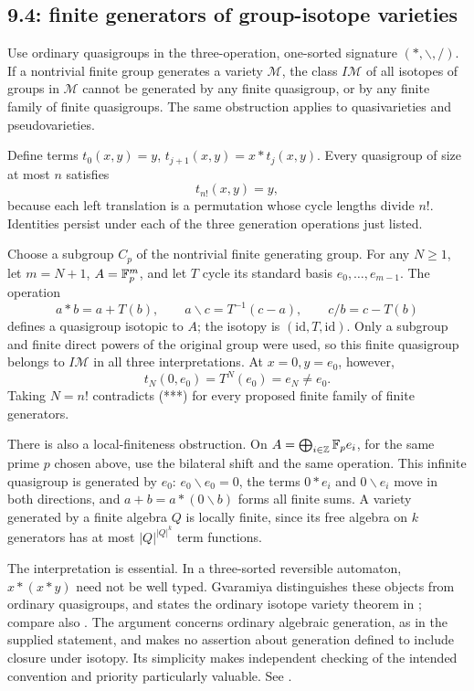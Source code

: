 \subsection{9.4: finite generators of group-isotope varieties}
\label{cand:9.4}
Use ordinary quasigroups in the three-operation, one-sorted signature
\((*,\backslash,/)\). If a nontrivial finite group generates a variety
\(\mathcal M\), the class \(I\mathcal M\) of all isotopes of groups in
\(\mathcal M\) cannot be generated by any finite quasigroup, or by any
finite family of finite quasigroups. The same obstruction applies to
quasivarieties and pseudovarieties.

Define terms \(t_0(x,y)=y\), \(t_{j+1}(x,y)=x*t_j(x,y)\).
Every quasigroup of size at most \(n\) satisfies
\[
 t_{n!}(x,y)=y,                                      \tag{***}
\]
because each left translation is a permutation whose cycle lengths
divide \(n!\). Identities persist under each of the three generation
operations just listed.

Choose a subgroup \(C_p\) of the nontrivial finite generating group.
For any \(N\ge1\), let \(m=N+1\), \(A=\mathbb F_p^m\), and let \(T\) cycle
its standard basis \(e_0,\ldots,e_{m-1}\).
The operation
\[
 a*b=a+T(b),\qquad
 a\backslash c=T^{-1}(c-a),\qquad c/b=c-T(b)
\]
defines a quasigroup isotopic to \(A\); the isotopy is
\((\mathrm{id},T,\mathrm{id})\). Only a subgroup and finite direct
powers of the original group were used, so this finite quasigroup
belongs to \(I\mathcal M\) in all three interpretations.
At \(x=0,y=e_0\), however,
\[
 t_N(0,e_0)=T^N(e_0)=e_N\ne e_0.
\]
Taking \(N=n!\) contradicts (***) for every proposed finite family of
finite generators.

There is also a local-finiteness obstruction. On
\(A=\bigoplus_{i\in\mathbb Z}\mathbb F_pe_i\), for the same prime \(p\) chosen above,
use the bilateral shift and the same
operation. This infinite quasigroup is generated by \(e_0\):
\(e_0\backslash e_0=0\), the terms \(0*e_i\) and
\(0\backslash e_i\) move in both directions, and
\(a+b=a*(0\backslash b)\) forms all finite sums.
A variety generated by a finite algebra \(Q\) is locally finite,
since its free algebra on \(k\) generators has at most
\(|Q|^{|Q|^k}\) term functions.

The interpretation is essential. In a three-sorted reversible automaton,
\(x*(x*y)\) need not be well typed. Gvaramiya distinguishes these
objects from ordinary quasigroups, and states the ordinary isotope
variety theorem in \cite[Section~3, Theorem~8]{gvaramiya-automata};
compare also \cite{krapez-marinkovic}.
The argument concerns ordinary algebraic generation, as in the supplied
statement, and makes no assertion about generation defined to include
closure under isotopy. Its simplicity makes independent checking of
the intended convention and priority particularly valuable.
See .
